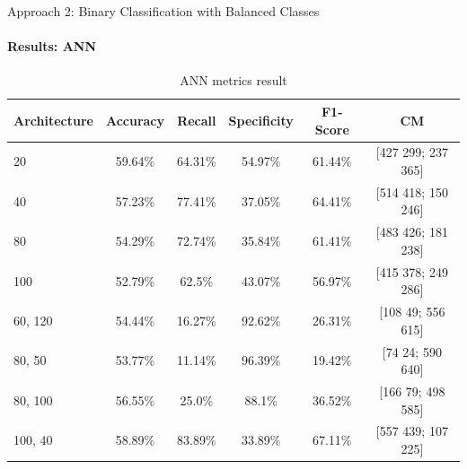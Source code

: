 \documentclass[9pt, pstricks, xcolor=dvipsnames]{beamer}
\begin{document}
\begin{frame}{Approach 2: Binary Classification
with Balanced Classes}
\framesubtitle{Results: ANN}
\begin{table}[H]
    \centering
    \begin{tabular}{lccccc}
        \toprule
        Architecture & Accuracy & Recall & Specificity & F1-Score & CM\\
        \midrule
        20 & 59.64\%  & 64.31\%  & 54.97\%  & 61.44\% & [427 299; 237 365] \\
        40 & 57.23\%  & 77.41\%  & 37.05\%  & 64.41\% & [514 418; 150 246] \\
        80 & 54.29\%  & 72.74\%  & 35.84\%  & 61.41\% & [483 426; 181 238] \\
        100 & 52.79\%  & 62.5\%  & 43.07\%  & 56.97\% & [415 378; 249 286] \\
        60, 120 & 54.44\%  & 16.27\%  & 92.62\%  & 26.31\% & [108 49; 556 615] \\
        80, 50 & 53.77\%  & 11.14\%  & 96.39\%  & 19.42\% & [74 24; 590 640] \\
        80, 100 & 56.55\%  & 25.0\%  & 88.1\%  & 36.52\% & [166 79; 498 585] \\
        100, 40 & 58.89\%  & 83.89\%  & 33.89\%  & 67.11\% & [557 439; 107 225] \\
        \bottomrule
    \end{tabular}
    \caption{ANN metrics result}
    \label{tab:ann_approach2}
\end{table}
\end{frame}
\end{document}
